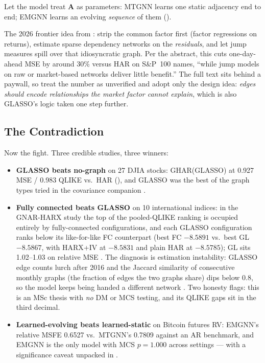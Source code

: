 \begin{description}[nosep]
  \item[Learned and evolving.] Let the model treat $\mathbf{A}$ as parameters: MTGNN learns one static adjacency end to end; EMGNN \citep{ZhouXieWangGongZhu2025} learns an evolving \emph{sequence} of them ().
  \item[Factor-residual (idiosyncratic) networks.] The 2026 frontier idea from \citet{CarteaCucuringuFang2026}: strip the common factor first (factor regressions on returns), estimate sparse dependency networks on the \emph{residuals}, and let jump measures spill over that idiosyncratic graph. Per the abstract, this cuts one-day-ahead MSE by around 30\% versus HAR on S\&P~100 names, ``while jump models on raw or market-based networks deliver little benefit.'' The full text sits behind a paywall, so treat the number as unverified and adopt only the design idea: \emph{edges should encode relationships the market factor cannot explain}, which is also GLASSO's logic taken one step further.
\end{description}

\subsection{The Contradiction}\label{sec:gnn:graph-contradiction}

Now the fight. Three credible studies, three winners:

\begin{itemize}[nosep]
  \item \textbf{GLASSO beats no-graph} on 27 DJIA stocks: GHAR(GLASSO) at 0.927 MSE / 0.983 QLIKE vs.\ HAR (), and GLASSO was the best of the graph types tried in the covariance companion \citep{ZhangCucuringuDong2023, ZhangPuCucuringuDong2024}.
  \item \textbf{Fully connected beats GLASSO} on 10 international indices: in the GNAR-HARX study the top of the pooled-QLIKE ranking is occupied entirely by fully-connected configurations, and each GLASSO configuration ranks below its like-for-like FC counterpart (best FC $-8.5891$ vs.\ best GL $-8.5867$, with HARX+IV at $-8.5831$ and plain HAR at $-8.5785$); GL sits 1.02--1.03 on relative MSE \citep[Table~4, p.~22]{ONuallain2025}. The diagnosis is estimation instability: GLASSO edge counts lurch after 2016 and the Jaccard similarity of consecutive monthly graphs (the fraction of edges the two graphs share) dips below 0.8, so the model keeps being handed a different network \citep[\S5.5, pp.~28--31]{ONuallain2025}. Two honesty flags: this is an MSc thesis with \emph{no} DM or MCS testing, and its QLIKE gaps sit in the third decimal.
  \item \textbf{Learned-evolving beats learned-static} on Bitcoin futures RV: EMGNN's relative MSFE 0.6527 vs.\ MTGNN's 0.7809 against an AR benchmark, and EMGNN is the only model with MCS $p = 1.000$ across settings \citep[Table~5, p.~23]{ZhouXieWangGongZhu2025} --- with a significance caveat unpacked in .
\end{itemize}

